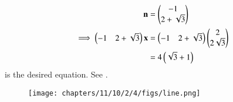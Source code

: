     \begin{align}
	    \mathbf{n} &= \begin{pmatrix}-1\\2+\sqrt{3}\end{pmatrix}
        \label{eq:11/10/2/4normal-vec}
	\\
        \implies \begin{pmatrix}-1&2+\sqrt{3}\end{pmatrix}\mathbf{x} &=\begin{pmatrix}-1&2+\sqrt{3}\end{pmatrix}\begin{pmatrix}2\\2\sqrt{3}\end{pmatrix}  
	    \\
	    &= 4\left(\sqrt{3}+1\right)
        \label{eq:11/10/2/4line}
    \end{align}
is the desired equation.  See .
    \begin{figure}[H]
        \centering
        \texttt{[image: chapters/11/10/2/4/figs/line.png]}
        \caption{}
        \label{fig:11/10/2/4line}
    \end{figure}
